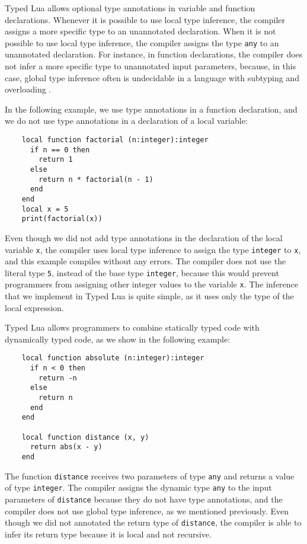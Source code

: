 Typed Lua allows optional type annotations in variable and function
declarations.
Whenever it is possible to use local type inference, the compiler
assigns a more specific type to an unannotated declaration.
When it is not possible to use local type inference, the compiler
assigns the type \texttt{any} to an unannotated declaration.
For instance, in function declarations, the compiler does not infer
a more specific type to unannotated input parameters, because,
in this case, global type inference often is undecidable in a
language with subtyping and overloading \citep{wells1999typability}.

In the following example, we use type annotations in a function
declaration, and we do not use type annotations in a declaration of a
local variable:
\begin{verbatim}
    local function factorial (n:integer):integer
      if n == 0 then
        return 1
      else
        return n * factorial(n - 1)
      end
    end
    local x = 5
    print(factorial(x))
\end{verbatim}

Even though we did not add type annotations in the declaration of
the local variable \texttt{x}, the compiler uses local type inference to
assign the type \texttt{integer} to \texttt{x}, and this example compiles
without any errors.
The compiler does not use the literal type \texttt{5},
instead of the base type \texttt{integer}, because this would prevent
programmers from assigning other integer values to the variable
\texttt{x}.
The inference that we implement in Typed Lua is quite simple, as it
uses only the type of the local expression.

Typed Lua allows programmers to combine statically typed code with
dynamically typed code, as we show in the following example:
\begin{verbatim}
    local function absolute (n:integer):integer
      if n < 0 then
        return -n
      else
        return n
      end
    end

    local function distance (x, y)
      return abs(x - y)
    end
\end{verbatim}

The function \texttt{distance} receives two parameters of type \texttt{any}
and returns a value of type \texttt{integer}.
The compiler assigns the dynamic type \texttt{any} to the input
parameters of \texttt{distance} because they do not have type annotations,
and the compiler does not use global type inference, as we mentioned
previously.
Even though we did not annotated the return type of \texttt{distance},
the compiler is able to infer its return type because it is local
and not recursive.

